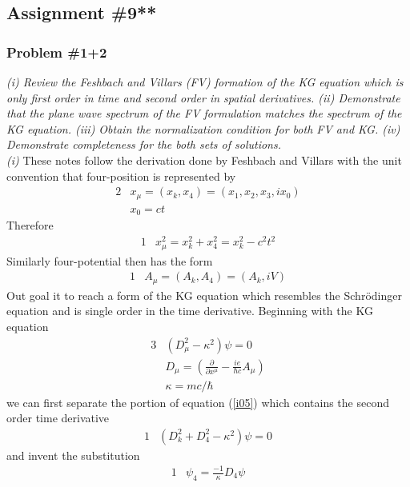 \documentclass[]{article}
\numberwithin{equation}{subsection}
\begin{document}
\subsection{Assignment \#9**}
\subsubsection*{Problem \#1+2}
\emph{(i) Review the Feshbach and Villars (FV) formation of the KG equation which is only first order in time and second order in spatial derivatives. (ii) Demonstrate that the plane wave spectrum of the FV formulation matches the spectrum of the KG equation. (iii) Obtain the normalization condition for both FV and KG. (iv) Demonstrate completeness for the both sets of solutions.}\\

\noindent \emph{(i)} These notes follow the derivation done by Feshbach and Villars with the unit convention that four-position is represented by
\begin{alignat}{2}
  \label{i01}  &x_{\mu}=(x_{k},x_{4})=(x_{1},x_{2},x_{3},ix_{0})\\
  \label{i02}  &x_{0}=ct
\end{alignat}
Therefore
\begin{alignat}{1}
  \label{i03}  &x_{\mu}^{2}=x_{k}^{2}+x_{4}^{2}=x_{k}^{2}-c^{2}t^{2}
\end{alignat}
Similarly four-potential then has the form
\begin{alignat}{1}
  \label{i04}  &A_{\mu}=(A_{k},A_{4})=(A_{k},iV)
\end{alignat}
Out goal it to reach a form of the KG equation which resembles the Schr{\"o}dinger equation and is single order in the time derivative. Beginning with the KG equation
\begin{alignat}{3}
  \label{i05}  &(D_{\mu}^{2}-\kappa^{2})\psi=0\\
  \label{i06}  &D_{\mu}=(\frac{\partial}{\partial x^{\mu}}-\frac{ie}{\hbar c}A_{\mu})\\
  \label{i07}  &\kappa = mc/\hbar
\end{alignat}
we can first separate the portion of equation (\ref{i05}) which contains the second order time derivative
\begin{alignat}{1}
  \label{i08}  &(D_{k}^{2}+D_{4}^{2}-\kappa^{2})\psi=0
\end{alignat}
and invent the substitution
\begin{alignat}{1}
  \label{i09}  &\psi_{4}=\frac{-1}{\kappa}D_{4}\psi
\end{alignat}
\end{document}
